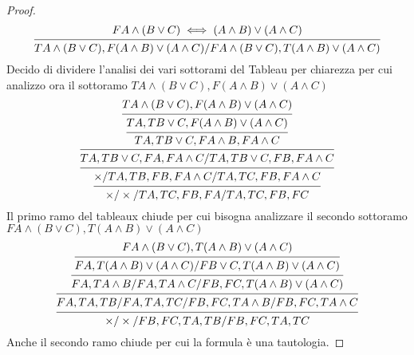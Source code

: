 \begin{proof}
\begin{equation*}
\begin{prooftree}
\hypo{F A \land (B \lor C) \iff (A \land B) \lor (A \land C)}
\infer1 {T A \land (B \lor C),F (A \land B) \lor (A \land C)/F A \land (B \lor C),T (A \land B) \lor (A \land C)}
\end{prooftree}
\end{equation*}
Decido di dividere l'analisi dei vari sottorami del Tableau per chiarezza per cui
analizzo ora il sottoramo $T A \land (B \lor C),F (A \land B) \lor (A \land C)$
\begin{equation*}
\begin{prooftree}
\hypo{T A \land (B \lor C),F (A \land B) \lor (A \land C)}
\infer1 {TA,T B \lor C,F (A \land B) \lor (A \land C)}
\infer1 {TA,T B \lor C,F A \land B,F A \land C}
\infer1 {TA,T B \lor C,FA,F A \land C/TA,T B \lor C,FB,F A \land C}
\infer1{\times/TA,TB,FB,F A \land C/TA,TC,FB,F A \land C}
\infer1 {\times/\times/TA,TC,FB,FA/TA,TC,FB,FC}
\end{prooftree}
\end{equation*}
Il primo ramo del tableaux chiude per cui bisogna analizzare il secondo sottoramo
$F A \land (B \lor C),T (A \land B) \lor (A \land C)$
\begin{equation*}
\begin{prooftree}
\hypo{F A \land (B \lor C),T (A \land B) \lor (A \land C)}
\infer1 {FA,T (A \land B) \lor (A \land C)/F B \lor C,T (A \land B) \lor (A \land C)}
\infer1 {FA,T A \land B/FA,T A \land C/FB,FC,T (A \land B) \lor (A \land C)}
\infer1 {FA,TA,TB/FA,TA,TC/FB,FC,T A \land B/FB,FC,T A \land C}
\infer1 {\times/\times/FB,FC,TA,TB/FB,FC,TA,TC}
\end{prooftree}
\end{equation*}
Anche il secondo ramo chiude per cui la formula è una tautologia.
\end{proof}
